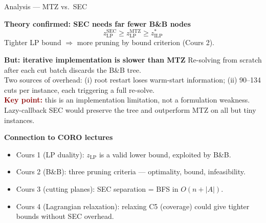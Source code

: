 \documentclass{beamer}
\begin{document}
\begin{frame}{Analysis --- MTZ vs.\ SEC}

\begin{block}{\textbf{Theory confirmed: SEC needs far fewer B\&B nodes}}
\small
$$z_{\mathrm{LP}}^{\mathrm{SEC}} \geq z_{\mathrm{LP}}^{\mathrm{MTZ}} \geq z_{\mathrm{ILP}}^*$$
Tighter LP bound $\Rightarrow$ more pruning by bound criterion (Cours 2).
\end{block}

\begin{block}{\textbf{But: iterative implementation is slower than MTZ}}
\small
Re-solving from scratch after each cut batch discards the B\&B tree.\\
Two sources of overhead: (i) root restart loses warm-start information; (ii) 90--134 cuts per instance, each triggering a full re-solve.\\[4pt]
\textcolor{darkred}{\textbf{Key point:}} this is an implementation limitation, not a formulation weakness.\\
Lazy-callback SEC would preserve the tree and outperform MTZ on all but tiny instances.
\end{block}

\begin{block}{\textbf{Connection to CORO lectures}}
\small
\begin{itemize}\setlength\itemsep{1pt}
  \item Cours 1 (LP duality): $z_\mathrm{LP}$ is a valid lower bound, exploited by B\&B.
  \item Cours 2 (B\&B): three pruning criteria --- optimality, bound, infeasibility.
  \item Cours 3 (cutting planes): SEC separation = BFS in $O(n+|A|)$.
  \item Cours 4 (Lagrangian relaxation): relaxing C5 (coverage) could give tighter bounds without SEC overhead.
\end{itemize}
\end{block}

\end{frame}
\end{document}
